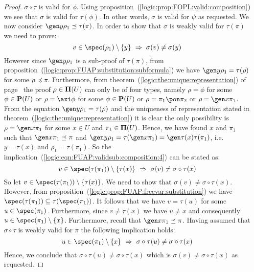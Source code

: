 \begin{proof}
$\sigma\circ\tau$ is valid for $\phi$. Using
proposition~(\ref{logic:prop:FOPL:valid:composition}) we see that
$\sigma$ is valid for $\tau(\phi)$. In other words, $\sigma$ is
valid for $\psi$ as requested. We now consider $\gen
y\rho_{1}\preceq\tau(\pi)$. In order to show that $\sigma$ is weakly
valid for $\tau(\pi)$ we need to prove:
    \begin{equation}\label{logic:eqn:FUAP:validsub:composition:4}
    v\in\spec(\rho_{1})\setminus\{y\}\ \Rightarrow\
    \sigma(v)\neq\sigma(y)
    \end{equation}
However since $\gen y\rho_{1}$ is a sub-proof of $\tau(\pi)$, from
proposition~(\ref{logic:prop:FUAP:substitution:subformula}) we have
$\gen y\rho_{1}=\tau(\rho)$ for some $\rho\preceq\pi$. Furthermore,
from theorem~(\ref{logic:the:unique:representation}) of
page~\pageref{logic:the:unique:representation} the proof
$\rho\in{\bf\Pi}(U)$ can only be of four types, namely $\rho=\phi$
for some $\phi\in{\bf P}(U)$ or $\rho=\axi\phi$ for some
$\phi\in{\bf P}(U)$ or $\rho=\pi_{1}\pon\pi_{2}$ or $\rho=\gen
x\pi_{1}$. From the equation $\gen y\rho_{1}=\tau(\rho)$ and the
uniqueness of representation stated in
theorem~(\ref{logic:the:unique:representation}) it is clear the only
possibility is $\rho=\gen x\pi_{1}$ for some $x\in U$ and
$\pi_{1}\in{\bf\Pi}(U)$. Hence, we have found $x$ and $\pi_{1}$ such
that $\gen x\pi_{1}\preceq\pi$ and $\gen y\rho_{1}=\tau(\gen
x\pi_{1})=\gen\tau(x)\tau(\pi_{1})$, i.e. $y=\tau(x)$ and
$\rho_{1}=\tau(\pi_{1})$. So the
implication~(\ref{logic:eqn:FUAP:validsub:composition:4}) can be
stated as:
    \begin{equation}\label{logic:eqn:FUAP:validsub:composition:5}
    v\in\spec(\tau(\pi_{1}))\setminus\{\tau(x)\}\ \Rightarrow\
    \sigma(v)\neq\sigma\circ\tau(x)
    \end{equation}
So let $v\in\spec(\tau(\pi_{1}))\setminus\{\tau(x)\}$. We need to
show that $\sigma(v)\neq\sigma\circ\tau(x)$. However, from
proposition~(\ref{logic:prop:FUAP:freevar:substitution}) we have
$\spec(\tau(\pi_{1}))\subseteq\tau(\spec(\pi_{1}))$. It follows that
we have $v=\tau(u)$ for some $u\in\spec(\pi_{1})$. Furthermore,
since $v\neq\tau(x)$ we have $u\neq x$ and consequently
$u\in\spec(\pi_{1})\setminus\{x\}$. Furthermore, recall that $\gen
x\pi_{1}\preceq\pi$. Having assumed that $\sigma\circ\tau$ is weakly
valid for $\pi$ the following implication holds:
    \begin{equation}\label{logic:eqn:FUAP:validsub:composition:6}
    u\in\spec(\pi_{1})\setminus\{x\}\ \Rightarrow\
    \sigma\circ\tau(u)\neq\sigma\circ\tau(x)
    \end{equation}
Hence, we conclude that $\sigma\circ\tau(u)\neq\sigma\circ\tau(x)$
which is $\sigma(v)\neq\sigma\circ\tau(x)$ as requested.
\end{proof}

